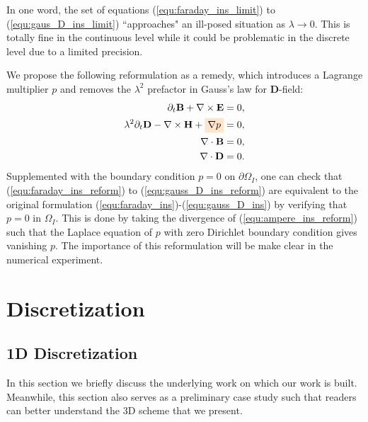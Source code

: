 \documentclass{article}
\begin{document}
In one word, the set of equations (\ref{equ:faraday_ins_limit}) to (\ref{equ:gaus_D_ins_limit}) ``approaches" an ill-posed situation as $\lambda \rightarrow 0$. This is totally fine in the continuous level while it could be problematic in the discrete level due to a limited precision. 

We propose the following reformulation as a remedy, which introduces a Lagrange multiplier $p$ and removes the $\lambda^2$ prefactor in Gauss's law for $\mathbf{D}$-field:
\begin{align}
    \partial_t \mathbf{B} + \nabla \times \mathbf{E} &= 0, \label{equ:faraday_ins_reform}\\ 
    \lambda^2 \partial_t \mathbf{D} - \nabla \times \mathbf{H} + \colorbox{orange!20}{$\nabla p$} &= 0,  \label{equ:ampere_ins_reform}\\
    \nabla \cdot \mathbf{B} &= 0, \label{equ:gauss_B_ins_reform}\\
    \nabla \cdot \mathbf{D} &= 0 \label{equ:gauss_D_ins_reform}.
\end{align}
Supplemented with the boundary condition $p = 0$ on $\partial\Omega_I$, one can check that (\ref{equ:faraday_ins_reform}) to (\ref{equ:gauss_D_ins_reform}) are equivalent to the original formulation (\ref{equ:faraday_ins})-(\ref{equ:gauss_D_ins}) by verifying that $p = 0$ in $\Omega_I$. This is done by taking the divergence of (\ref{equ:ampere_ins_reform}) such that the Laplace equation of $p$ with zero Dirichlet boundary condition gives vanishing $p$. The importance of this reformulation will be make clear in the numerical experiment.

\section{Discretization}

\subsection{1D Discretization}
In this section we briefly discuss the underlying work \cite{degond_2012} on which our work is built. Meanwhile, this section also serves as a preliminary case study such that readers can better understand the 3D scheme that we present. 
\end{document}
